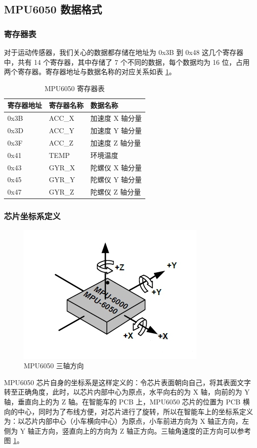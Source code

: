 \subsection{MPU6050 数据格式}
\subsubsection{寄存器表}
对于运动传感器，我们关心的数据都存储在地址为 0x3B 到 0x48 这几个寄存器中，共有 14 个寄存器，其中存储了 7 个不同的数据，每个数据均为 16 位，占用两个寄存器。寄存器地址与数据名称的对应关系如表 \ref{mpu_regs}。

\begin{table}[htbp]
 \centering
 \caption{MPU6050 寄存器表}
 \label{mpu_regs}
 \begin{tabular}{|l|l|l|}
  \hline
  寄存器地址 & 寄存器名称 & 数据名称         \\ \hline
  0x3B     & ACC\_X    & 加速度 X 轴分量    \\
  0x3D     & ACC\_Y    & 加速度 Y 轴分量    \\
  0x3F     & ACC\_Z    & 加速度 Z 轴分量    \\
  0x41     & TEMP     & 环境温度          \\
  0x43     & GYR\_X    & 陀螺仪 X 轴分量    \\
  0x45     & GYR\_Y    & 陀螺仪 Y 轴分量    \\
  0x47     & GYR\_Z    & 陀螺仪 Z 轴分量    \\ \hline
 \end{tabular}
\end{table}

\subsubsection{芯片坐标系定义}

\begin{figure}[h]
\centering %
\includegraphics[width=.4\textwidth]{mpu_axis.jpg}
\caption{MPU6050 三轴方向}
\label{mpu_axis}
\end{figure}

MPU6050 芯片自身的坐标系是这样定义的：令芯片表面朝向自己，将其表面文字转至正确角度，此时，以芯片内部中心为原点，水平向右的为 X 轴，向前的为 Y 轴，垂直向上的为 Z 轴。在智能车的 PCB 上，MPU6050 芯片的位置为 PCB 横向的中心，同时为了布线方便，对芯片进行了旋转，所以在智能车上的坐标系定义为：以芯片内部中心（小车横向中心）为原点，小车前进方向为 X 轴正方向，左侧为 Y 轴正方向，竖直向上的方向为 Z 轴正方向。三轴角速度的正方向可以参考图 \ref{mpu_axis}。

